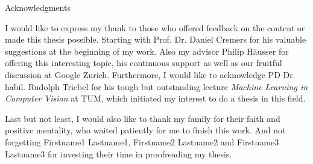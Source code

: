 \thispagestyle{empty}

\vspace*{20mm}

\begin{center}
{ Acknowledgments}
\end{center}

\vspace{10mm}

I would like to express my thank to those who offered feedback on the content or made this thesis possible. Starting with Prof. Dr. Daniel Cremers for his valuable suggestions at the beginning of my work. Also my advisor Philip Häusser for offering this interesting topic, his continuous support as well as our fruitful discussion at Google Zurich. Furthermore, I would like to acknowledge PD Dr. habil. Rudolph Triebel for his tough but outstanding lecture \textit{Machine Learning in Computer Vision} at TUM, which initiated my interest to do a thesis in this field.


Last but not least, I would also like to thank my family for their faith and positive mentality, who waited patiently for me to finish this work. And not forgetting Firstname1 Lastname1, Firstname2 Lastname2 and Firstname3 Lastname3 for investing their time in proofreading my thesis.

\cleardoublepage{}
